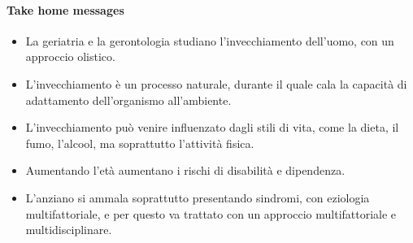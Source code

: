\paragraph{Take home messages}
\begin{itemize}
\item La geriatria e la gerontologia studiano l'invecchiamento dell'uomo, con un
approccio olistico.
\item L'invecchiamento è un processo naturale, durante il quale cala la capacità
di adattamento dell'organismo all'ambiente.
\item L'invecchiamento può venire influenzato dagli stili di vita, come la
dieta, il fumo, l'alcool, ma soprattutto l'attività fisica.
\item Aumentando l'età aumentano i rischi di disabilità e dipendenza.
\item L'anziano si ammala soprattutto presentando sindromi, con eziologia
multifattoriale, e per questo va trattato con un approccio multifattoriale e
multidisciplinare.
\end{itemize}
